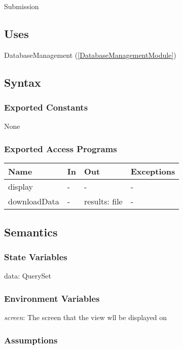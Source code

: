 \documentclass[12pt, titlepage]{article}
\begin{document}
Submission

\subsection{Uses}

DatabaseManagement (\ref{DatabaseManagementModule})

\subsection{Syntax}

\subsubsection{Exported Constants}

None

\subsubsection{Exported Access Programs}

\begin{center}
\begin{tabular}{p{3cm} p{3cm} p{4cm} p{2cm}}
\hline
\textbf{Name} & \textbf{In} & \textbf{Out} & \textbf{Exceptions} \\
\hline
display & - & - & - \\
downloadData & - & results: file & - \\
\hline
\end{tabular}
\end{center}

\subsection{Semantics}

\subsubsection{State Variables}

data: QuerySet

\subsubsection{Environment Variables}

\textit{screen}: The screen that the view wll be displayed on

\subsubsection{Assumptions}
\end{document}
